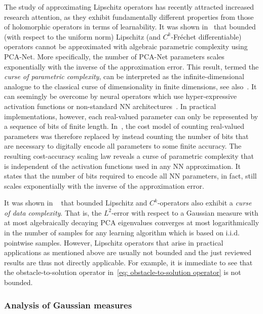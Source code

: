 \documentclass[namedate,webpdf]{ima-authoring-template-blank}
\numberwithin{counter}{section}
\numberwithin{equation}{section}
\theoremstyle{plain}
\theoremstyle{definition}
\theoremstyle{thmstyletwo}
\begin{document}
The study of approximating Lipschitz operators has recently attracted increased research attention, as they exhibit fundamentally different properties from those of holomorphic operators in terms of learnability. It was shown in~\citet{lanthaler_OperatorLearningPCANetUpper_2023} that bounded (with respect to the uniform norm) Lipschitz (and \(C^k\)-Fréchet differentiable) operators cannot be approximated with algebraic parametric complexity using PCA-Net. More specifically, the number of PCA-Net parameters scales exponentially with the inverse of the approximation error. This result, termed the \emph{curse of parametric complexity}, can be interpreted as the infinite-dimensional analogue to the classical curse of dimensionality in finite dimensions, see also~\citet{lanthaler_ParametricComplexityOperatorLearning_2026}. It can seemingly be overcome by neural operators which use hyper-expressive activation functions or non-standard NN architectures~\citep{schwab_DeepOperatorNetworkApproximation_2026}. In practical implementations, however, each real-valued parameter can only be represented by a sequence of bits of finite length. 
In~\citet{lanthaler_OperatorLearningLipschitzOperators_2024}, the cost model of counting real-valued parameters was therefore replaced by instead counting the number of bits that are necessary to digitally encode all parameters to some finite accuracy. The resulting cost-accuracy scaling law reveals a curse of parametric complexity that is independent of the activation functions used in any NN approximation. It states that the number of bits required to encode all NN parameters, in fact, still scales exponentially with the inverse of the approximation error. 

It was shown in ~\citet{kovachki_DataComplexityEstimatesOperator_2024} that bounded Lipschitz and \(C^k\)-operators also exhibit a \emph{curse of data complexity}. That is, the \(L^2\)-error with respect to a Gaussian measure with at most algebraically decaying PCA eigenvalues converges at most logarithmically in the number of samples for any learning algorithm which is based on i.i.d. pointwise samples. 
However, Lipschitz operators that arise in practical applications as mentioned above are usually not bounded and the just reviewed results are thus not directly applicable. For example, it is immediate to see that the obstacle-to-solution operator in~\eqref{eq: obstacle-to-solution operator} is not bounded.



\subsubsection{Analysis of Gaussian measures}
\end{document}
